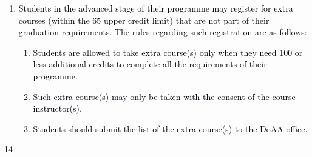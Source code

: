 \documentclass[12pt]{article}
\begin{document}
\vspace{\baselineskip}
\begin{enumerate}
	\item {\fontsize{10pt}{12.0pt}\selectfont \textcolor[HTML]{00000A}{Students in the advanced stage of their programme may register for extra courses (within the 65 upper credit limit) that are not part of their graduation requirements. The rules regarding such registration are as follows:}\par}\par


\vspace{\baselineskip}
\begin{enumerate}
	\item {\fontsize{10pt}{12.0pt}\selectfont \textcolor[HTML]{00000A}{Students are allowed to take extra course(s) only when they need 100 or less additional credits to complete all the requirements of their programme.}\par}\par


\vspace{\baselineskip}
	\item {\fontsize{10pt}{12.0pt}\selectfont \textcolor[HTML]{00000A}{Such extra course(s) may only be taken with the consent of the course instructor(s).}\par}\par


\vspace{\baselineskip}
	\item {\fontsize{10pt}{12.0pt}\selectfont \textcolor[HTML]{00000A}{Students should submit the list of the extra course(s) to the DoAA office.}\par}
\end{enumerate}
\end{enumerate}\par


\vspace{\baselineskip}
\begin{Center}
\textcolor[HTML]{00000A}{14}
\end{Center}\par
\end{document}
